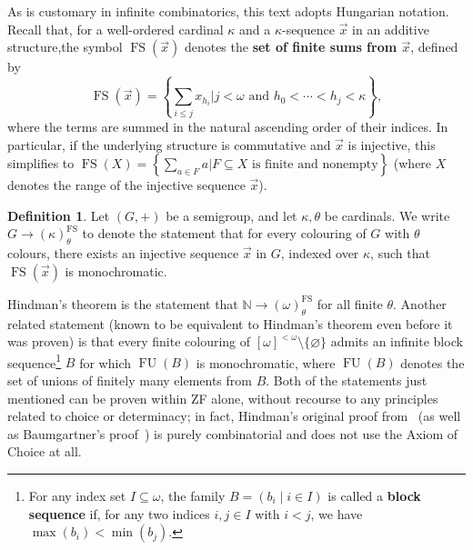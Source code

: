 \documentclass{amsart}
\theoremstyle{definition}
\newtheorem{definition}[theorem]{Definition}
\theoremstyle{remark}
\numberwithin{equation}{section}
\begin{document}
As is customary in infinite combinatorics, this text adopts Hungarian notation. Recall that, for a well-ordered cardinal $\kappa$ and a $\kappa$-sequence $\vec{x}$ in an additive structure,\linebreak the symbol $\operatorname{FS}(\vec{x})$ denotes the {\bf set of finite sums from $\vec{x}$},
defined by
\begin{equation*}
    \operatorname{FS}(\vec{x})=\left\{\sum_{i\leq j}x_{h_{i}}\big|j<\omega\text{ and }h_{0}<\cdots<h_{j}<\kappa\right\},
\end{equation*}
where the terms are summed in the natural ascending order of their indices.\linebreak
In particular, if the underlying structure is commutative and $\vec{x}$ is injective, this simplifies to $\operatorname{FS}(X)=\left\{\sum_{a\in F}a\big|F\subseteq X\text{ is finite and nonempty}\right\}$ (where $X$ denotes the range of the injective sequence $\vec{x}$).

\begin{definition} \label{def:hindman-property}
Let $(G,+)$ be a semigroup, and let $\kappa,\theta$ be cardinals.\linebreak 
We write $G\to(\kappa)^{\operatorname{FS}}_{\theta}$ to denote the statement that for every colouring of $G$ with $\theta$ colours, there exists an injective sequence $\vec{x}$ in $G$, indexed over $\kappa$, such that $\operatorname{FS}(\vec{x})$ is monochromatic.%
\end{definition}

Hindman's theorem \cite{Hindman1974} is the statement that $\mathbb N\to(\omega)^{\operatorname{FS}}_{\theta}$ for all finite $\theta$. Another related statement (known to be equivalent to Hindman's theorem even before it was proven) is that every finite colouring of $[\omega]^{<\omega}\setminus\{\varnothing\}$ admits an infinite block sequence\footnote{For any index set $I\subseteq\omega$, the family $B=(b_{i}\mid i\in I)$ is called a {\bf block sequence} if, for any two indices $i, j\in I$ with $i<j$, we have $\max(b_{i})<\min(b_{j})$.} $B$ for which $\operatorname{FU}(B)$ is monochromatic, where $\operatorname{FU}(B)$ denotes the set of unions of finitely many elements from $B$. Both of the statements just mentioned can be proven within ZF alone, without recourse to any principles related to choice or determinacy; in fact, Hindman's original proof from~\cite{Hindman1974} (as well as Baumgartner's proof~\cite{Baumgartner1974}) is purely combinatorial and does not use the Axiom of Choice at all.
\end{document}
